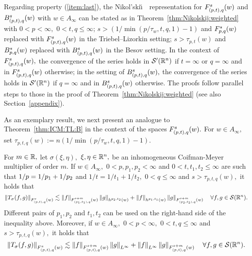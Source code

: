 Regarding property (\ref{item:last}), the  Nikol'ski\u\i$\text{ }$ representation for $\itlw{(p,t)}{s}{q}{w}$  and $\ibesw{(p,t)}{s}{q}{w}$ with $w\in A_\infty$ can be stated as in  Theorem~\ref{thm:Nikolskij:weighted} with $0 < p< \infty,$ $0<t,q\le \infty$;  $s > (1/\min(p/\tau_w, t, q,1)-1)$ and $\itlw{p}{s}{q}{w}$ replaced with $\itlw{(p,t)}{s}{q}{w}$ in the Triebel--Lizorkin setting;  $s> \tau_{p,t}(w)$ and $\ibesw{p}{s}{q}{w}$ replaced with $\ibesw{(p,t)}{s}{q}{w}$ in the Besov setting. In the context of $\itlw{(p,t)}{s}{q}{w},$ the convergence of the series  holds in $\swp$ if $t=\infty$ or $q=\infty$ and in $\itlw{(p,t)}{s}{q}{w}$ otherwise; in the setting of $\ibesw{(p,t)}{s}{q}{w},$ the convergence of the series holds in $\swp$ if $q=\infty$ and in $\ibesw{(p,t)}{s}{q}{w}$ otherwise. The proofs follow parallel steps to those in the proof of Theorem~\ref{thm:Nikolskij:weighted} (see also Section~\ref{appendix}).
 




As an exemplary result, we next present an analogue  to Theorem~\ref{thm:ICM:TL:B} in the context of the spaces $\itlw{(p,t)}{s}{q}{w}.$ For $w\in A_\infty,$ set $\tau_{p,t,q}(w):=n(1/\min(p/\tau_w, t, q, 1)-1).$

\begin{theorem}\label{thm:ICM:Lorentz}  For $m \in \re,$ let $\sigma(\xi,\eta),$ $\xi,\eta\in\rn,$ be an inhomogeneous Coifman-Meyer multiplier of order $m.$ If $w\in A_\infty,$ $0 < p, p_1, p_2 < \infty$ and $0 < t, t_1, t_2\le \infty$  are  such that $\hcline$ and $1/t=1/t_1+1/t_2,$  $0 < q \le \infty$  and  $s > \tau_{p,t,q}(w),$  it holds that
\begin{equation*}
\norm{T_\sigma(f,g)}{\itlw{(p,t)}{s}{q}{w}} \lesssim \norm{f}{\itlw{(p_1,t_1)}{s+m}{q}{w}} \norm{g}{h^{p_2,t_2}(w)} +  \norm{f}{h^{p_1,t_1}(w)}   \norm{g}{\itlw{(p_2,t_2)}{s+m}{q}{w}} \quad \forall f, g \in \sw.
\end{equation*}
Different pairs of $p_1,p_2$ and $t_1, t_2$ can be used on the right-hand side of the inequality above. 
Moreover, if $w\in A_\infty,$ $0<p<\infty,$ $0<t,q\le \infty$   and $s > \tau_{p,t,q}(w),$  it holds that
\begin{equation*}
\norm{T_\sigma(f,g)}{\itlw{(p,t)}{s}{q}{w}} \lesssim \norm{f}{\itlw{(p,t)}{s+m}{q}{w}} \norm{g}{L^\infty} +  \norm{f}{L^\infty}   \norm{g}{\itlw{(p,t)}{s+m}{q}{w}} \quad \forall f, g \in \sw.
\end{equation*}
\end{theorem}

